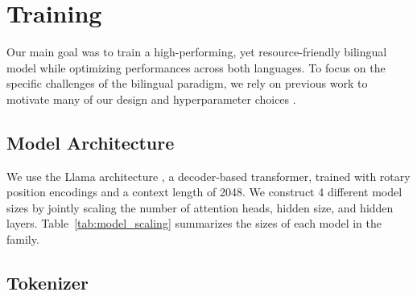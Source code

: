 

\section{Training}

Our main goal was to train a high-performing, yet resource-friendly bilingual model while optimizing performances across both languages. To focus on the specific challenges of the bilingual paradigm, we rely on previous work to motivate many of our design and hyperparameter choices .

\subsection{Model Architecture}
We use the Llama architecture \cite{touvron2023llama}, a decoder-based transformer, trained with rotary position encodings  and a context length of 2048. 
We construct 4 different model sizes by jointly scaling the number of attention heads, hidden size, and hidden layers. Table~\ref{tab:model_scaling} summarizes the sizes of each model in the family.

\begin{table}
    \centering

    \caption[Scaling law model info]{Model information for scaling laws. Parameter count excludes embedding and output parameters.}
    \label{tab:model_scaling}
\end{table}



\subsection{Tokenizer}

